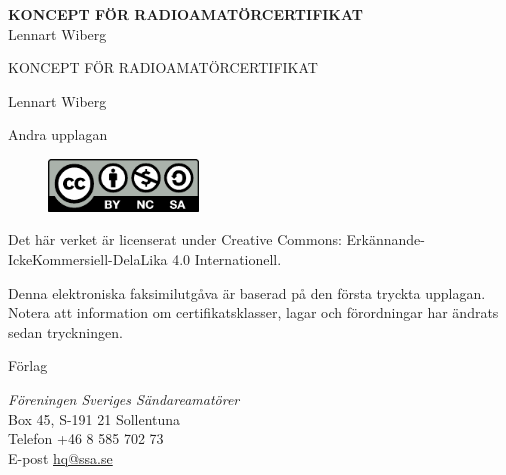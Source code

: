 \documentclass[a4paper,twoside,twocolumn,openright]{book}
\begin{document}
\pagestyle{empty}


\onecolumn
\vspace{3cm}
\begin{center}
\Huge{\bfseries{KONCEPT FÖR RADIOAMATÖRCERTIFIKAT}} \\[2ex]
\huge{Lennart Wiberg}	
\end{center}
\clearpage



\setlength{\parindent}{0px}
\setlength{\parskip}{1ex}

\vspace{10em}

\begin{center}
KONCEPT FÖR RADIOAMATÖRCERTIFIKAT

Lennart Wiberg
\end{center}


Andra upplagan

\begin{figure}
\centering
\includegraphics[width=4cm]{images/cc-by-nc-sa}
\end{figure}

Det här verket är licenserat under Creative Commons:
Erkännande-IckeKommersiell-DelaLika 4.0 Internationell.

Denna elektroniska faksimilutgåva är baserad på den första tryckta
upplagan. Notera att information om certifikatsklasser, lagar och förordningar
har ändrats sedan tryckningen.


\vfill

Förlag

\textit{Föreningen Sveriges Sändareamatörer}\\
Box 45, S-191 21 Sollentuna\\
Telefon +46 8 585 702 73\\
E-post \href{mailto:hq@ssa.se}{hq@ssa.se}

\cleardoublepage
\pagestyle{fancy}
\twocolumn
\end{document}

